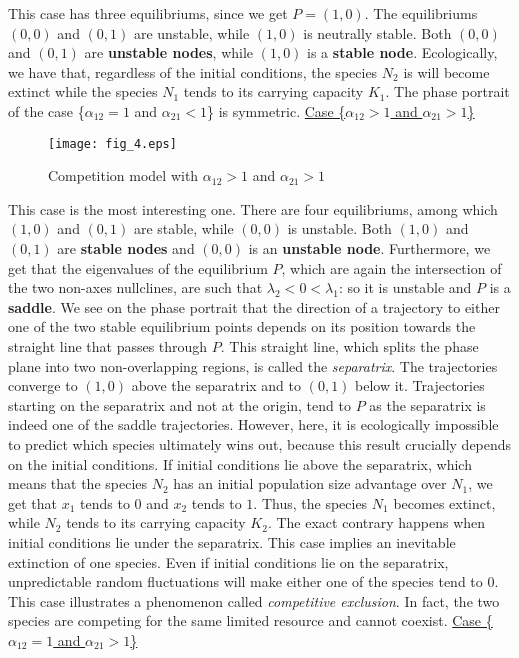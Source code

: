 \documentclass[11pt,a4paper]{scrartcl}
\theoremstyle{definition}
\begin{document}
This case has three equilibriums, since we get $P=(1, 0)$. The equilibriums $(0, 0)$ and $(0, 1)$ are unstable, while $(1, 0)$ is neutrally stable. Both $(0, 0)$ and $(0, 1)$ are \textbf{unstable nodes}, while $(1, 0)$ is a \textbf{stable node}. Ecologically, we have that, regardless of the initial conditions, the species $N_2$ is will become extinct while the species $N_1$ tends to its carrying capacity $K_1$. The phase portrait of the case \Big\{$\alpha_{12} = 1$ and $\alpha_{21} < 1$\Big\} is symmetric.
\FloatBarrier
\vspace{1em}
\underline{Case \Big\{$\alpha_{12} > 1$ and $\alpha_{21} > 1$\Big\}}\newline

\begin{figure}[!ht]
\centering
\texttt{[image: fig\_4.eps]}
\caption{Competition model with $\alpha_{12} > 1$ and $\alpha_{21} > 1$}
\label{figC4}
\end{figure} 

This case is the most interesting one. There are four equilibriums, among which $(1, 0)$ and $(0, 1)$ are stable, while $(0, 0)$ is unstable. Both $(1, 0)$ and $(0, 1)$ are \textbf{stable nodes} and $(0, 0)$ is an \textbf{unstable node}. Furthermore, we get that the eigenvalues of the equilibrium $P$, which are again the intersection of the two non-axes nullclines, are such that $\lambda_2<0<\lambda_1$: so it is unstable and $P$ is a \textbf{saddle}. We see on the phase portrait that the direction of a trajectory to either one of the two stable equilibrium points depends on its position towards the straight line that passes through $P$. This straight line, which splits the phase plane into two non-overlapping regions, is called the \textit{separatrix}. The trajectories converge to $(1, 0)$ above the separatrix and to $(0, 1)$ below it. Trajectories starting on the separatrix and not at the origin, tend to $P$ as the separatrix is indeed one of the saddle trajectories. However, here, it is ecologically impossible to predict which species ultimately wins out, because this result crucially depends on the initial conditions. If initial conditions lie above the separatrix, which means that the species $N_2$ has an initial population size advantage over $N_1$, we get that $x_1$ tends to $0$ and $x_2$ tends to $1$. Thus, the species $N_1$ becomes extinct, while $N_2$ tends to its carrying capacity $K_2$. The exact contrary happens when initial conditions lie under the separatrix. This case implies an inevitable extinction of one species. Even if initial conditions lie on the separatrix, unpredictable random fluctuations will make either one of the species tend to $0$. This case illustrates a phenomenon called \textit{competitive exclusion}. In fact, the two species are competing for the same limited resource and cannot coexist.
\FloatBarrier
\vspace{1em}
\underline{Case \Big\{$\alpha_{12} = 1$ and $\alpha_{21} > 1$\Big\}}\newline
\end{document}
